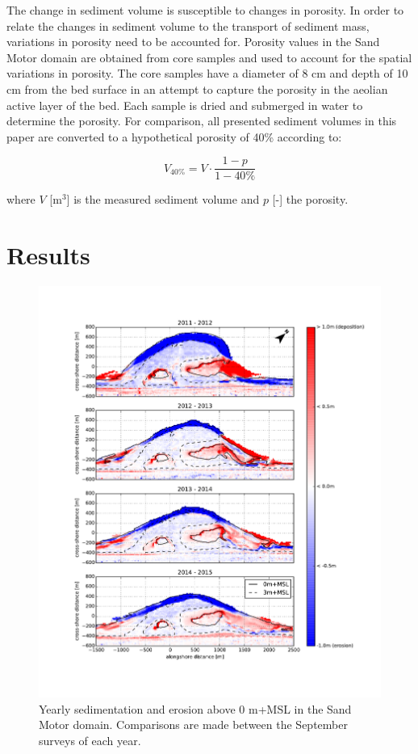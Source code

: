 The change in sediment volume is susceptible to changes in
porosity. In order to relate the changes in sediment volume to the
transport of sediment mass, variations in porosity need to be
accounted for. Porosity values in the Sand Motor domain are obtained
from core samples and used to account for the spatial variations in
porosity. The core samples have a diameter of 8 cm and depth of 10 cm
from the bed surface in an attempt to capture the porosity in the
aeolian active layer of the bed. Each sample is dried and submerged in
water to determine the porosity. For comparison, all presented
sediment volumes in this paper are converted to a hypothetical
porosity of 40\% according to:

\begin{equation}
  V_{\mathrm{40\%}} = V \cdot \frac{1 - p}{1 - 40\%}
\end{equation}

\noindent where $V$ [$\mathrm{m^3}$] is the measured sediment volume
and $p$ [-] the porosity.

\section{Results}

\begin{figure}
  \centering
  \includegraphics[width=\columnwidth]{../Figures/sedero}
  \caption{Yearly sedimentation and erosion above 0 m+MSL in the Sand
    Motor domain. Comparisons are made between the September surveys
    of each year.}
  \label{fig:sedero}
\end{figure}

